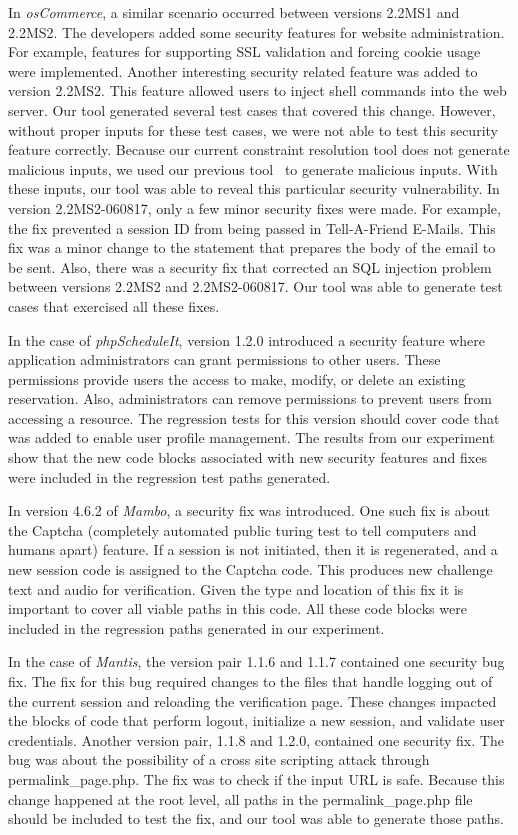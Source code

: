 In {\em osCommerce}, a similar scenario occurred between versions
2.2MS1 and 2.2MS2. The developers added some security features for 
website administration. For example, features for supporting SSL 
validation and forcing cookie usage were implemented.
Another interesting security related feature was added to
version 2.2MS2. This feature allowed users to inject shell commands 
into the web server. Our tool generated several test cases that 
covered this change. 
However, without proper inputs for these test
cases, we were not able to test this security feature correctly.
Because our current constraint resolution tool does not generate 
malicious inputs, we used our previous tool~\cite{marback09} to
generate malicious inputs. With these inputs, our tool was able 
to reveal this particular security vulnerability.
In version 2.2MS2-060817, only a few minor security fixes were made. 
For example, the fix prevented a session ID from being passed in 
Tell-A-Friend E-Mails. This fix was a minor change to the statement 
that prepares the body of the email to be sent. 
Also, there was a security fix that corrected 
an SQL injection problem between versions 2.2MS2 and 2.2MS2-060817. 
Our tool was able to generate test cases
that exercised all these fixes. 

In the case of {\em phpScheduleIt}, version 1.2.0 introduced a security 
feature where application administrators can grant permissions 
to other users. These permissions provide users the access to make, 
modify, or delete an existing reservation. Also, administrators can 
remove permissions to prevent users from accessing a resource. 
The regression tests for this version should cover code that was added 
to enable user profile management. The results from our experiment show 
that the new code blocks associated with new security features and fixes 
were included in the regression test paths generated. 

In version 4.6.2 of {\em Mambo}, a security fix was introduced. 
One such fix is about the Captcha (completely automated public 
turing test to tell computers and humans apart) feature. 
If a session is not initiated, then it is regenerated, and a new 
session code is assigned to the Captcha code. 
This produces new challenge text and audio for verification. 
Given the type and location of this fix it is important to cover all 
viable paths in this code. All these code blocks were included 
in the regression paths generated in our experiment.
 
In the case of {\em Mantis}, the version pair 1.1.6 and 1.1.7
contained one security bug fix. The fix for this bug required 
changes to the files that handle logging out of the current session 
and reloading the verification page. 
These changes impacted the blocks of code that perform logout, 
initialize a new session, and validate user credentials.
Another version pair, 1.1.8 and 1.2.0, contained one security fix. 
The bug was about the possibility of a cross site scripting attack 
through permalink\_page.php. The fix was to check if the input URL 
is safe. Because this change happened at the root level, all paths 
in the permalink\_page.php file should be included to test the fix,
and our tool was able to generate those paths. 
 

